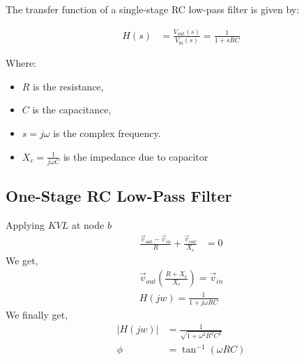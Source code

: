 \documentclass[a4paper,12pt]{article}
\begin{document}
The transfer function of a single-stage RC low-pass filter is given by:

\begin{align*}
H(s) &= \frac{V_{\text{out}}(s)}{V_{\text{in}}(s)} = \frac{1}{1 + sRC}
\end{align*}

Where:
\begin{itemize}
    \item $ R $ is the resistance,
    \item $ C $ is the capacitance,
    \item $ s = j\omega $ is the complex frequency.
    \item $X_c = \frac{1}{j\omega C}$ is the impedance due to capacitor
\end{itemize}

\subsection{One-Stage RC Low-Pass Filter}
\pagebreak
\begin{figure}[!h]
\centering
{}%
\label{one-cascade}
\end{figure}
Applying $KVL$ at node $b$
\begin{align*}
    \frac{\vec{v}_{out} - \vec{v}_{in}}{R} + \frac{\vec{v}_{out}}{X_c} &= 0
\end{align*}
We get, 
\begin{align*}
    \vec{v}_{out} \left( \frac{R+X_c}{X_c} \right) = \vec{v}_{in}\\
    H(jw) =  \frac{1}{1+j\omega RC}
\end{align*}
We finally get,
\begin{align*}
    |H(jw)| &= \frac{1}{\sqrt{1 + \omega^2 R^2 C^2}}\\
    \phi &= \tan^{-1}\left( \omega RC\right)
\end{align*}
\end{document}

